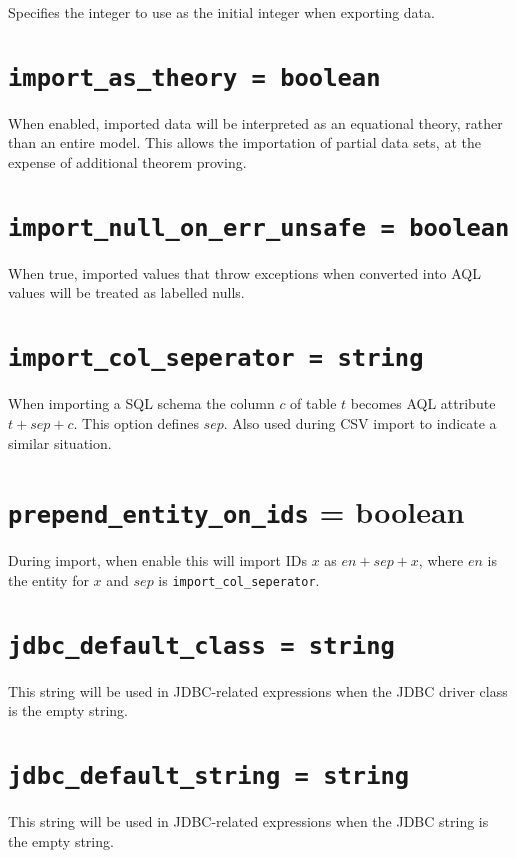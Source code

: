 \documentclass[10pt]{book}
\begin{document}
Specifies the integer to use as the initial integer when exporting data.

\section{ {\tt import\_as\_theory = boolean}}

When enabled, imported data will be interpreted as an equational theory, rather than an entire model.  This allows the importation of partial data sets, at the expense of additional theorem proving.

\section{ {\tt import\_null\_on\_err\_unsafe = boolean} }

When true, imported values that throw exceptions when converted into AQL values will be treated as labelled nulls.
			
\section{ {\tt import\_col\_seperator = string} }

When importing a SQL schema the column $c$ of table $t$ becomes AQL attribute $t + sep + c$.  This option defines $sep$.  Also used during CSV import to indicate a similar situation.

\section{ {\tt prepend\_entity\_on\_ids} = boolean }

During import, when enable this will import IDs $x$ as $en + sep + x$, where $en$ is the entity for $x$ and $sep$ is  {\tt import\_col\_seperator}. 

\section{ {\tt jdbc\_default\_class = string } }

This string will be used in JDBC-related expressions when the JDBC driver class is the empty string.

\section{ {\tt jdbc\_default\_string = string } }

This string will be used in JDBC-related expressions when the JDBC string is the empty string.
\end{document}
